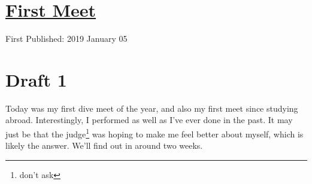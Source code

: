 \documentclass[12pt]{article}[titlepage]
\newcommand{\1}{\={a}}
\newcommand{\2}{\={e}}
\newcommand{\3}{\={\i}}
\newcommand{\4}{\=o}
\newcommand{\5}{\=u}
\newcommand{\6}{\={A}}
\renewcommand{\,}{\textsuperscript{,}}
\begin{document}
\doublespacing
\section{\href{first-meet.html}{First Meet}}
First Published: 2019 January 05
\section{Draft 1}
Today was my first dive meet of the year, and also my first meet since studying abroad.
Interestingly, I performed as well as I've ever done in the past.
It may just be that the judge\footnote{don't ask} was hoping to make me feel better about myself, which is likely the answer.
We'll find out in around two weeks.
\end{document}
